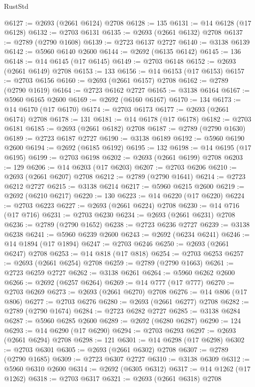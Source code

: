 \begin{lexlean}{RustStd}
\begin{coremodule}
@6127 := @2693 (@2661 @6124) @2708
@6128 := 135
@6131 := @14 @6128 (@17 @6128)
@6132 := @2703 @6131
@6135 := @2693 (@2661 @6132) @2708
@6137 := @2789 (@2790 @1608)
@6139 := @2723 @6137 @2727
@6140 := @3138 @6139
@6142 := @5960 @6140 @2600
@6144 := @2692 (@6135 @6142)
@6145 := 136
@6148 := @14 @6145 (@17 @6145)
@6149 := @2703 @6148
@6152 := @2693 (@2661 @6149) @2708
@6153 := 133
@6156 := @14 @6153 (@17 @6153)
@6157 := @2703 @6156
@6160 := @2693 (@2661 @6157) @2708
@6162 := @2789 (@2790 @1619)
@6164 := @2723 @6162 @2727
@6165 := @3138 @6164
@6167 := @5960 @6165 @2600
@6169 := @2692 (@6160 @6167)
@6170 := 134
@6173 := @14 @6170 (@17 @6170)
@6174 := @2703 @6173
@6177 := @2693 (@2661 @6174) @2708
@6178 := 131
@6181 := @14 @6178 (@17 @6178)
@6182 := @2703 @6181
@6185 := @2693 (@2661 @6182) @2708
@6187 := @2789 (@2790 @1630)
@6189 := @2723 @6187 @2727
@6190 := @3138 @6189
@6192 := @5960 @6190 @2600
@6194 := @2692 (@6185 @6192)
@6195 := 132
@6198 := @14 @6195 (@17 @6195)
@6199 := @2703 @6198
@6202 := @2693 (@2661 @6199) @2708
@6203 := 129
@6206 := @14 @6203 (@17 @6203)
@6207 := @2703 @6206
@6210 := @2693 (@2661 @6207) @2708
@6212 := @2789 (@2790 @1641)
@6214 := @2723 @6212 @2727
@6215 := @3138 @6214
@6217 := @5960 @6215 @2600
@6219 := @2692 (@6210 @6217)
@6220 := 130
@6223 := @14 @6220 (@17 @6220)
@6224 := @2703 @6223
@6227 := @2693 (@2661 @6224) @2708
@6230 := @14 @716 (@17 @716)
@6231 := @2703 @6230
@6234 := @2693 (@2661 @6231) @2708
@6236 := @2789 (@2790 @1652)
@6238 := @2723 @6236 @2727
@6239 := @3138 @6238
@6241 := @5960 @6239 @2600
@6243 := @2692 (@6234 @6241)
@6246 := @14 @1894 (@17 @1894)
@6247 := @2703 @6246
@6250 := @2693 (@2661 @6247) @2708
@6253 := @14 @818 (@17 @818)
@6254 := @2703 @6253
@6257 := @2693 (@2661 @6254) @2708
@6259 := @2789 (@2790 @1663)
@6261 := @2723 @6259 @2727
@6262 := @3138 @6261
@6264 := @5960 @6262 @2600
@6266 := @2692 (@6257 @6264)
@6269 := @14 @777 (@17 @777)
@6270 := @2703 @6269
@6273 := @2693 (@2661 @6270) @2708
@6276 := @14 @806 (@17 @806)
@6277 := @2703 @6276
@6280 := @2693 (@2661 @6277) @2708
@6282 := @2789 (@2790 @1674)
@6284 := @2723 @6282 @2727
@6285 := @3138 @6284
@6287 := @5960 @6285 @2600
@6289 := @2692 (@6280 @6287)
@6290 := 124
@6293 := @14 @6290 (@17 @6290)
@6294 := @2703 @6293
@6297 := @2693 (@2661 @6294) @2708
@6298 := 121
@6301 := @14 @6298 (@17 @6298)
@6302 := @2703 @6301
@6305 := @2693 (@2661 @6302) @2708
@6307 := @2789 (@2790 @1685)
@6309 := @2723 @6307 @2727
@6310 := @3138 @6309
@6312 := @5960 @6310 @2600
@6314 := @2692 (@6305 @6312)
@6317 := @14 @1262 (@17 @1262)
@6318 := @2703 @6317
@6321 := @2693 (@2661 @6318) @2708

\end{coremodule}
\end{lexlean}
